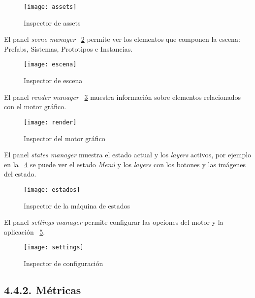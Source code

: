 \begin{figure}[h!]
    \centering
    \texttt{[image: assets]}
    \caption{Inspector de assets}
    \label{assets_inspector}
\end{figure}

El panel \textit{scene manager} \figurename~\ref{scene_inspector} 
permite ver los elementos que componen la escena: Prefabs, Sistemas, Prototipos e Instancias.

\begin{figure}[h!]
    \centering
    \texttt{[image: escena]}
    \caption{Inspector de escena}
    \label{scene_inspector}
\end{figure}

El panel \textit{render manager} \figurename~\ref{render_inspector} 
muestra información sobre elementos relacionados con el motor gráfico.

\begin{figure}[h!]
    \centering
    \texttt{[image: render]}
    \caption{Inspector del motor gráfico}
    \label{render_inspector}
\end{figure}

El panel \textit{states manager} muestra el estado actual y los \textit{layers} activos, por ejemplo en la \figurename~\ref{states_inspector}
se puede ver el estado \textit{Menú} y los \textit{layers} con los botones y las imágenes del estado.

\begin{figure}[h!]
    \centering
    \texttt{[image: estados]}
    \caption{Inspector de la máquina de estados}
    \label{states_inspector}
\end{figure}

\newpage
\vfill

El panel \textit{settings manager} permite configurar las opciones del motor y la aplicación \figurename~\ref{settings_inspector}.

\begin{figure}[h!]
    \centering
    \texttt{[image: settings]}
    \caption{Inspector de configuración}
    \label{settings_inspector}
\end{figure}

\subsection*{4.4.2. Métricas}\label{sec:workflow_debugger_metrics}

